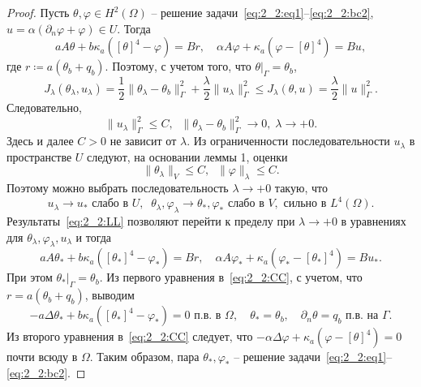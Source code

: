 \begin{proof}
    Пусть $\theta,\varphi\in H^2(\Omega)$ -- решение
    задачи~\eqref{eq:2_2:eq1}--\eqref{eq:2_2:bc2},
    $u=\alpha(\partial_n\varphi + \varphi)\in U$.
    Тогда
    \[
        a A \theta + b \kappa_a ([\theta]^4 - \varphi ) = Br,\quad
        \alpha A \varphi + \kappa_a (\varphi - [\theta]^4) = Bu,
    \]
    где $r \coloneqq a(\theta_b+q_b)$.
    Поэтому, с учетом того, что $\theta|_\Gamma=\theta_b$,
    \[
        J_\lambda(\theta_\lambda, u_\lambda)
        = \frac{1}{2}\|\theta_\lambda -\theta_b\|^2_\Gamma
        + \frac{\lambda}{2}\|u_\lambda\|^2_\Gamma
        \leq J_\lambda(\theta, u) = \frac{\lambda}{2}\|u\|^2_\Gamma.
    \]
    Следовательно,
    \[
        \|u_\lambda\|^2_\Gamma\leq C,\;\; \|\theta_\lambda
        -\theta_b\|^2_\Gamma\to 0,\; \lambda\to + 0.
    \]
    Здесь и далее $C>0$ не зависит от $\lambda.$
    Из ограниченности последовательности $u_\lambda$ в пространстве $U$ следуют, на основании
    леммы 1, оценки
    \[
        \|\theta_\lambda\|_V \leq C,\;\;
        \|\varphi\|_\lambda \leq C.
    \]
    Поэтому можно выбрать последовательность $\lambda\to+0$ такую, что
    \begin{equation}
        \label{eq:2_2:LL}
        u_\lambda \rightarrow u_* \text{  слабо в } U, \;\;
        \theta_\lambda, \varphi_\lambda \rightarrow \theta_*,\varphi_*
        \text{ слабо в } V, \text{ сильно в } L^4(\Omega).
    \end{equation}
    Результаты~\eqref{eq:2_2:LL} позволяют перейти к пределу при $\lambda\to+0$
    в уравнениях для $\theta_\lambda,\varphi_\lambda,u_\lambda$ и тогда
    \begin{equation}
        \label{eq:2_2:CC}
        a A \theta_* + b \kappa_a ([\theta_*]^4 - \varphi_* ) = Br,\quad
        \alpha A \varphi_* + \kappa_a (\varphi_* - [\theta_*]^4)  = Bu_*.
    \end{equation}
    При этом $\theta_*|_\Gamma=\theta_b$.
    Из первого уравнения в~\eqref{eq:2_2:CC}, с учетом, что $r = a(\theta_b + q_b)$,
    выводим
    \[
        - a\Delta\theta_* + b\kappa_a([\theta_*]^4- \varphi_*) = 0 \text{ п.в. в }\Omega,
        \quad \theta_*=\theta_b,\quad \partial_n\theta = q_b \text{ п.в. на }\Gamma.
    \]
    Из второго уравнения в~\eqref{eq:2_2:CC} следует, что
    $-\alpha \Delta \varphi + \kappa_a(\varphi-[\theta]^4) = 0$ почти всюду в $\Omega$.
    Таким образом, пара $\theta_*,\varphi_*$
    -- решение задачи~\eqref{eq:2_2:eq1}--\eqref{eq:2_2:bc2}.
\end{proof}

